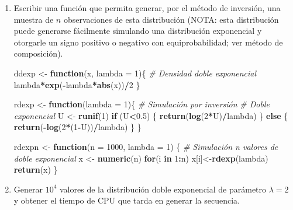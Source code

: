 \documentclass[]{book}
\newenvironment{Shaded}{\begin{snugshade}}{\end{snugshade}}
\newcommand{\KeywordTok}[1]{\textcolor[rgb]{0.13,0.29,0.53}{\textbf{#1}}}
\newcommand{\DataTypeTok}[1]{\textcolor[rgb]{0.13,0.29,0.53}{#1}}
\newcommand{\DecValTok}[1]{\textcolor[rgb]{0.00,0.00,0.81}{#1}}
\newcommand{\FloatTok}[1]{\textcolor[rgb]{0.00,0.00,0.81}{#1}}
\newcommand{\StringTok}[1]{\textcolor[rgb]{0.31,0.60,0.02}{#1}}
\newcommand{\CommentTok}[1]{\textcolor[rgb]{0.56,0.35,0.01}{\textit{#1}}}
\newcommand{\ControlFlowTok}[1]{\textcolor[rgb]{0.13,0.29,0.53}{\textbf{#1}}}
\newcommand{\OperatorTok}[1]{\textcolor[rgb]{0.81,0.36,0.00}{\textbf{#1}}}
\newcommand{\NormalTok}[1]{#1}
\theoremstyle{definition}
\theoremstyle{definition}
\theoremstyle{definition}
\theoremstyle{remark}
\begin{document}
\begin{enumerate}
\def\labelenumi{\alph{enumi})}
\item
  Escribir una función que permita generar, por el método de inversión,
  una muestra de \(n\) observaciones de esta distribución (NOTA: esta
  distribución puede generarse fácilmente simulando una distribución
  exponencial y otorgarle un signo positivo o negativo con
  equiprobabilidad; ver método de composición).

\begin{Shaded}
\begin{Highlighting}[]
\NormalTok{ddexp <-}\StringTok{ }\ControlFlowTok{function}\NormalTok{(x, }\DataTypeTok{lambda =} \DecValTok{1}\NormalTok{)\{}
\CommentTok{# Densidad doble exponencial}
\NormalTok{  lambda}\OperatorTok{*}\KeywordTok{exp}\NormalTok{(}\OperatorTok{-}\NormalTok{lambda}\OperatorTok{*}\KeywordTok{abs}\NormalTok{(x))}\OperatorTok{/}\DecValTok{2}
\NormalTok{\}}

\NormalTok{rdexp <-}\StringTok{ }\ControlFlowTok{function}\NormalTok{(}\DataTypeTok{lambda =} \DecValTok{1}\NormalTok{)\{}
\CommentTok{# Simulación por inversión}
\CommentTok{# Doble exponencial}
\NormalTok{  U <-}\StringTok{ }\KeywordTok{runif}\NormalTok{(}\DecValTok{1}\NormalTok{)}
  \ControlFlowTok{if}\NormalTok{ (U}\OperatorTok{<}\FloatTok{0.5}\NormalTok{) \{}
    \KeywordTok{return}\NormalTok{(}\KeywordTok{log}\NormalTok{(}\DecValTok{2}\OperatorTok{*}\NormalTok{U)}\OperatorTok{/}\NormalTok{lambda)}
\NormalTok{  \} }\ControlFlowTok{else}\NormalTok{ \{}
    \KeywordTok{return}\NormalTok{(}\OperatorTok{-}\KeywordTok{log}\NormalTok{(}\DecValTok{2}\OperatorTok{*}\NormalTok{(}\DecValTok{1}\OperatorTok{-}\NormalTok{U))}\OperatorTok{/}\NormalTok{lambda)}
\NormalTok{  \}}
\NormalTok{\}}

\NormalTok{rdexpn <-}\StringTok{ }\ControlFlowTok{function}\NormalTok{(}\DataTypeTok{n =} \DecValTok{1000}\NormalTok{, }\DataTypeTok{lambda =} \DecValTok{1}\NormalTok{) \{}
\CommentTok{# Simulación n valores de doble exponencial}
\NormalTok{    x <-}\StringTok{ }\KeywordTok{numeric}\NormalTok{(n)}
    \ControlFlowTok{for}\NormalTok{(i }\ControlFlowTok{in} \DecValTok{1}\OperatorTok{:}\NormalTok{n) x[i]<-}\KeywordTok{rdexp}\NormalTok{(lambda)}
    \KeywordTok{return}\NormalTok{(x)}
\NormalTok{\}}
\end{Highlighting}
\end{Shaded}
\item
  Generar \(10^{4}\) valores de la distribución doble exponencial de
  parámetro \(\lambda=2\) y obtener el tiempo de CPU que tarda en
  generar la secuencia.


\end{enumerate}
\end{document}
